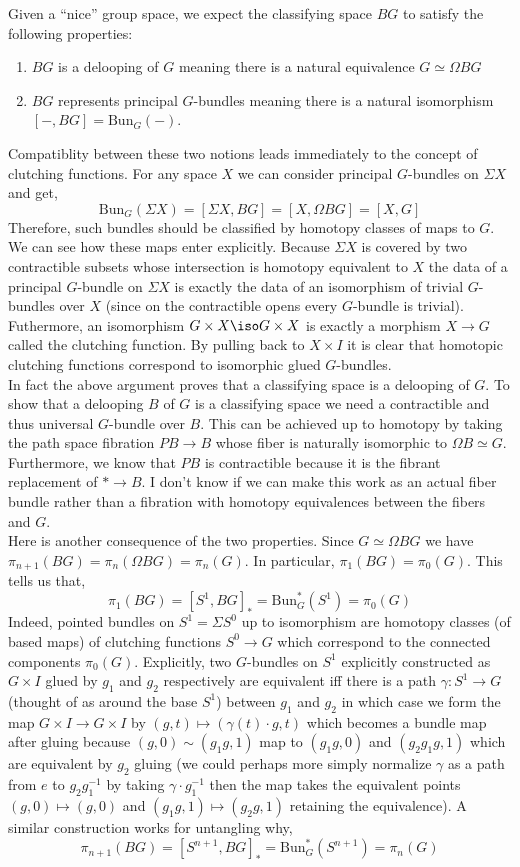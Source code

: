 \documentclass[12pt]{extarticle}
\newcommand{\Bun}{\mathrm{Bun}}
\begin{document}
Given a ``nice'' group space, we expect the classifying space $BG$ to satisfy the following properties:
\begin{enumerate}
\item $BG$ is a delooping of $G$ meaning there is a natural equivalence $G \simeq \Omega BG$
\item $BG$ represents principal $G$-bundles meaning there is a natural isomorphism $[-, BG] = \Bun_G(-)$.
\end{enumerate}
Compatiblity between these two notions leads immediately to the concept of clutching functions. For any space $X$ we can consider principal $G$-bundles on $\Sigma X$ and get,
\[ \Bun_G(\Sigma X) = [\Sigma X, BG] = [X, \Omega BG] = [X, G] \]
Therefore, such bundles should be classified by homotopy classes of maps to $G$. We can see how these maps enter explicitly. Because $\Sigma X$ is covered by two contractible subsets whose intersection is homotopy equivalent to $X$ the data of a principal $G$-bundle on $\Sigma X$ is exactly the data of an isomorphism of trivial $G$-bundles over $X$ (since on the contractible opens every $G$-bundle is trivial). Futhermore, an isomorphism $G \times X \iso G \times X$ is exactly a morphism $X \to G$ called the clutching function. By pulling back to $X \times I$ it is clear that homotopic clutching functions correspond to isomorphic glued $G$-bundles.
\bigskip\\
In fact the above argument proves that a classifying space is a delooping of $G$. To show that a delooping $B$ of $G$ is a classifying space we need a contractible and thus universal $G$-bundle over $B$. This can be achieved up to homotopy by taking the path space fibration $PB \to B$ whose fiber is naturally isomorphic to $\Omega B \simeq G$. Furthermore, we know that $PB$ is contractible because it is the fibrant replacement of $* \to B$. I don't know if we can make this work as an actual fiber bundle rather than a fibration with homotopy equivalences between the fibers and $G$.
\bigskip\\
Here is another consequence of the two properties. Since $G \simeq \Omega BG$ we have $\pi_{n+1}(BG) = \pi_n(\Omega BG) = \pi_n(G)$. In particular, $\pi_1(BG) = \pi_0(G)$. This tells us that,
\[ \pi_1(BG) = [S^1, BG]_* = \Bun_G^*(S^1) = \pi_0(G) \]
Indeed, pointed bundles on $S^1 = \Sigma S^0$ up to isomorphism are homotopy classes (of based maps) of clutching functions $S^0 \to G$ which correspond to the connected components $\pi_0(G)$. Explicitly, two $G$-bundles on $S^1$ explicitly constructed as $G \times I$ glued by $g_1$ and $g_2$ respectively are equivalent iff there is a path $\gamma : S^1 \to G$ (thought of as around the base $S^1$) between $g_1$ and $g_2$ in which case we form the map $G \times I \to G \times I$ by $(g, t) \mapsto (\gamma(t) \cdot g, t)$ which becomes a bundle map after gluing because $(g, 0) \sim (g_1 g, 1)$ map to $(g_1 g, 0)$ and $(g_2 g_1 g, 1)$ which are equivalent by $g_2$ gluing (we could perhaps more simply normalize $\gamma$ as a path from $e$ to $g_2 g_1^{-1}$ by taking $\gamma \cdot g_1^{-1}$ then the map takes the equivalent points $(g, 0) \mapsto (g, 0)$ and $(g_1 g, 1) \mapsto (g_2 g, 1)$ retaining the equivalence). A similar construction works for untangling why,
\[ \pi_{n+1}(BG) = [S^{n+1}, BG]_* = \Bun^*_G(S^{n+1}) = \pi_n(G) \]
\end{document}
